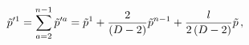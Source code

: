 \begin{equation}
\tilde p^{\prime 1} =\sum_{a=2}^{n-1} \tilde p^{\prime a} = \tilde p^1 +{2\over
(D-2)}
\tilde p^{n-1}+{l\over 2\, (D-2)} \tilde p \, ,
\end{equation} 
